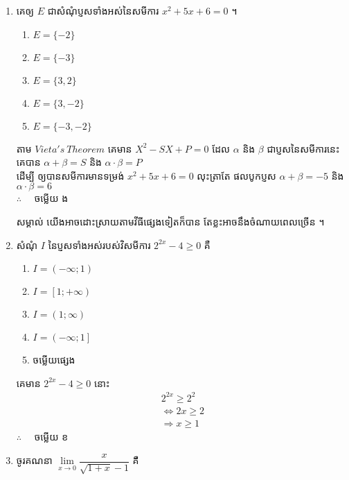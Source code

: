 \documentclass[12pt, a4paper]{article}
\begin{document}
\maketitle\koc
\begin{enumerate}[m]
	\item គេឲ្យ $E$ ជាសំណុំប្ញសទាំងអស់នៃសមីការ $x^2+5x+6=0$ ។ 
	\begin{enumerate}[k,5]
		\item $E=\lbrace-2\rbrace$
		\item $E=\lbrace-3\rbrace$
		\item $E=\lbrace3,2\rbrace$
		\item $E=\lbrace3,-2\rbrace$
		\item $E=\lbrace-3,-2\rbrace$
	\end{enumerate}
	\answer
	\begin{center}
		តាម  $Vieta's~Theorem$ គេមាន $X^2-SX+P=0$ ដែល $\alpha$ និង $\beta$ ជាប្ញសនៃសមីការនេះ គេបាន $\alpha+\beta=S$ និង $\alpha\cdot\beta=P$ \\
		ដើម្បី ឲ្យបានសមីការមានទម្រង់ $x^2+5x+6=0$ លុះត្រាតែ ផលបូកប្ញស $\alpha+\beta=-5$ និង $\alpha\cdot\beta=6$\\
		$\therefore \quad$ \kml ចម្លើយ \kbk ង
	\end{center}
	\kml សម្គាល់ \kb យើងអាចដោះស្រាយតាមវីធីផ្សេងទៀតក៏បាន តែខ្លះអាចនឹងចំណាយពេលច្រើន ។\\
	{\color{blue}\hrulefill}
	\item សំណុំ $I$ នៃប្ញសទាំងអស់របស់វិសមីការ $2^{2x}-4\ge0$ គឺ
	\begin{enumerate}[k,3]
		\item $I=\left(-\infty;1\right)$
		\item $I=\left[1;+\infty\right)$
		\item $I=\left(1;\infty\right)$
		\item $I=\left(-\infty;1\right]$
		\item ចម្លើយផ្សេង
	\end{enumerate}
	\answer
	\begin{center}
		គេមាន $2^{2x}-4\ge0$ នោះ
		\begin{align*}
		2^{2x} \ge 2^{2}\\
		\Leftrightarrow 2x \ge 2\\
		\Rightarrow x\ge1
		\end{align*}
		$\therefore \quad$ \kml ចម្លើយ \kbk ខ
	\end{center}
	{\color{blue}\hrulefill}
	\item ចូរគណនា $\lim\limits_{x\to0}\dfrac{x}{\sqrt{1+x}-1}$ គឺ

\end{enumerate}
\end{document}

